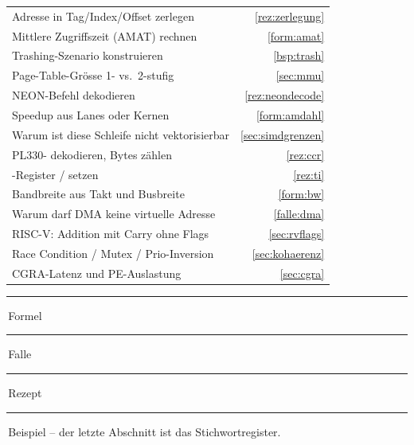 
\begin{tcolorbox}[zfbox, colback=black!2, colframe=black!45,
  coltitle=white, colbacktitle=black!45, title={Wenn die Aufgabe lautet \dots}]
\begin{tabularx}{\linewidth}{@{}Xr@{}}
Adresse in Tag/Index/Offset zerlegen & \ref{rez:zerlegung} \\
Mittlere Zugriffszeit (AMAT) rechnen & \ref{form:amat} \\
Trashing-Szenario konstruieren & \ref{bsp:trash} \\
Page-Table-Grösse 1- vs.\ 2-stufig & \ref{sec:mmu} \\
NEON-Befehl dekodieren & \ref{rez:neondecode} \\
Speedup aus Lanes oder Kernen & \ref{form:amdahl} \\
Warum ist diese Schleife nicht vektorisierbar & \ref{sec:simdgrenzen} \\
PL330-\R{CCR} dekodieren, Bytes zählen & \ref{rez:ccr} \\
\R{TI}-Register / \R{SRC\_INC} setzen & \ref{rez:ti} \\
Bandbreite aus Takt und Busbreite & \ref{form:bw} \\
Warum darf DMA keine virtuelle Adresse & \ref{falle:dma} \\
RISC-V: Addition mit Carry ohne Flags & \ref{sec:rvflags} \\
Race Condition / Mutex / Prio-Inversion & \ref{sec:kohaerenz} \\
CGRA-Latenz und PE-Auslastung & \ref{sec:cgra} \\
\end{tabularx}
\vspace{2pt}
\textcolor{accent}{\rule{7pt}{7pt}}\,Formel \;
\textcolor{red!65}{\rule{7pt}{7pt}}\,Falle \;
\textcolor{green!40!black}{\rule{7pt}{7pt}}\,Rezept \;
\textcolor{black!55}{\rule{7pt}{7pt}}\,Beispiel \;
-- der letzte Abschnitt ist das Stichwortregister.
\end{tcolorbox}
